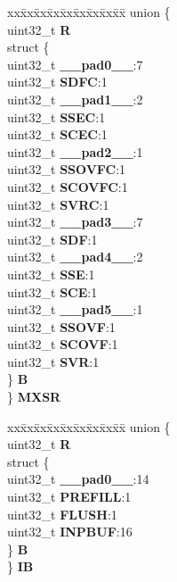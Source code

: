 \begin{DoxyCompactItemize}
\begin{tabbing}
\end{tabbing}\item 
\mbox{\label{structDECFIL__tag_a6d9d32496c19c5904cd3b2a29c3275e9}} 
\begin{tabbing}
xx\=xx\=xx\=xx\=xx\=xx\=xx\=xx\=xx\=\kill
union \{\\
\>uint32\_t {\bfseries R}\\
\>struct \{\\
\>\>uint32\_t {\bfseries \_\_pad0\_\_}:7\\
\>\>uint32\_t {\bfseries SDFC}:1\\
\>\>uint32\_t {\bfseries \_\_pad1\_\_}:2\\
\>\>uint32\_t {\bfseries SSEC}:1\\
\>\>uint32\_t {\bfseries SCEC}:1\\
\>\>uint32\_t {\bfseries \_\_pad2\_\_}:1\\
\>\>uint32\_t {\bfseries SSOVFC}:1\\
\>\>uint32\_t {\bfseries SCOVFC}:1\\
\>\>uint32\_t {\bfseries SVRC}:1\\
\>\>uint32\_t {\bfseries \_\_pad3\_\_}:7\\
\>\>uint32\_t {\bfseries SDF}:1\\
\>\>uint32\_t {\bfseries \_\_pad4\_\_}:2\\
\>\>uint32\_t {\bfseries SSE}:1\\
\>\>uint32\_t {\bfseries SCE}:1\\
\>\>uint32\_t {\bfseries \_\_pad5\_\_}:1\\
\>\>uint32\_t {\bfseries SSOVF}:1\\
\>\>uint32\_t {\bfseries SCOVF}:1\\
\>\>uint32\_t {\bfseries SVR}:1\\
\>\} {\bfseries B}\\
\} {\bfseries MXSR}\\

\end{tabbing}\item 
\mbox{\label{structDECFIL__tag_a9537e07608261b3836210d31d839b933}} 
\begin{tabbing}
xx\=xx\=xx\=xx\=xx\=xx\=xx\=xx\=xx\=\kill
union \{\\
\>uint32\_t {\bfseries R}\\
\>struct \{\\
\>\>uint32\_t {\bfseries \_\_pad0\_\_}:14\\
\>\>uint32\_t {\bfseries PREFILL}:1\\
\>\>uint32\_t {\bfseries FLUSH}:1\\
\>\>uint32\_t {\bfseries INPBUF}:16\\
\>\} {\bfseries B}\\
\} {\bfseries IB}\\


\end{tabbing}
\end{DoxyCompactItemize}
